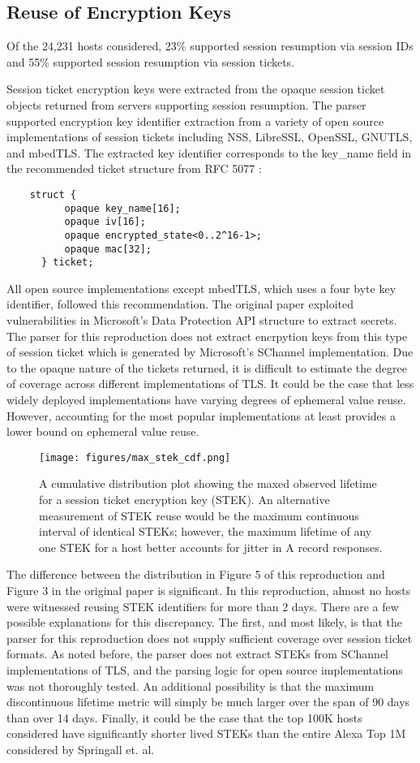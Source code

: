 \subsection{Reuse of Encryption Keys}
Of the 24,231 hosts considered, 23\% supported session resumption via session IDs and 55\% supported session resumption via session tickets.

Session ticket encryption keys were extracted from the opaque session ticket objects returned from servers supporting session resumption. The parser supported encryption key identifier extraction from a variety of open source implementations of session tickets including NSS, LibreSSL, OpenSSL, GNUTLS, and mbedTLS. The extracted key identifier corresponds to the key\_name field in the recommended ticket structure from RFC 5077 \cite{RFC5077} : 

\begin{verbatim}
    struct {
          opaque key_name[16];
          opaque iv[16];
          opaque encrypted_state<0..2^16-1>;
          opaque mac[32];
      } ticket;
\end{verbatim}
All open source implementations except mbedTLS, which uses a four byte key identifier, followed this recommendation. The original paper exploited vulnerabilities in Microsoft's Data Protection API structure to extract secrets. The parser for this reproduction does not extract encrpytion keys from this type of session ticket which is generated by Microsoft's SChannel implementation. Due to the opaque nature of the tickets returned, it is difficult to estimate the degree of coverage across different implementations of TLS. It could be the case that less widely deployed implementations have varying degrees of ephemeral value reuse. However, accounting for the most popular implementations at least provides a lower bound on ephemeral value reuse.
\begin{figure}
\centering
\texttt{[image: figures/max\_stek\_cdf.png]}
\caption{A cumulative distribution plot showing the maxed observed lifetime for a session ticket encryption key (STEK). An alternative measurement of STEK reuse would be the maximum continuous interval of identical STEKs; however, the maximum lifetime of any one STEK for a host better accounts for jitter in A record responses.}
\end{figure}

The difference between the distribution in Figure 5 of this reproduction and Figure 3 in the original paper is significant. In this reproduction, almost no hosts were witnessed reusing STEK identifiers for more than 2 days. There are a few possible explanations for this discrepancy. The first, and most likely, is that the parser for this reproduction does not supply sufficient coverage over session ticket formats. As noted before, the parser does not extract STEKs from SChannel implementations of TLS, and the parsing logic for open source implementations was not thoroughly tested. An additional possibility is that the maximum discontinuous lifetime metric will simply be much larger over the span of 90 days than over 14 days. Finally, it could be the case that the top 100K hosts considered have significantly shorter lived STEKs than the entire Alexa Top 1M considered by Springall et. al.

